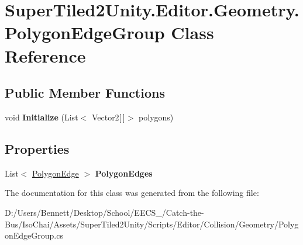 \hypertarget{class_super_tiled2_unity_1_1_editor_1_1_geometry_1_1_polygon_edge_group}{}\section{Super\+Tiled2\+Unity.\+Editor.\+Geometry.\+Polygon\+Edge\+Group Class Reference}
\label{class_super_tiled2_unity_1_1_editor_1_1_geometry_1_1_polygon_edge_group}
\subsection*{Public Member Functions}
\begin{DoxyCompactItemize}
\item 
\mbox{\label{class_super_tiled2_unity_1_1_editor_1_1_geometry_1_1_polygon_edge_group_a5bb3ef55d94324236da230c709122c20}} 
void {\bfseries Initialize} (List$<$ Vector2\mbox{[}$\,$\mbox{]}$>$ polygons)
\end{DoxyCompactItemize}
\subsection*{Properties}
\begin{DoxyCompactItemize}
\item 
\mbox{\label{class_super_tiled2_unity_1_1_editor_1_1_geometry_1_1_polygon_edge_group_a0a6243ec62d3a03b588acb68de09cc55}} 
List$<$ \mbox{\hyperlink{class_super_tiled2_unity_1_1_editor_1_1_geometry_1_1_polygon_edge}{Polygon\+Edge}} $>$ {\bfseries Polygon\+Edges}
\end{DoxyCompactItemize}


The documentation for this class was generated from the following file\+:\begin{DoxyCompactItemize}
\item 
D\+:/\+Users/\+Bennett/\+Desktop/\+School/\+E\+E\+C\+S\+\_/\+Catch-\/the-\/\+Bus/\+Iso\+Chai/\+Assets/\+Super\+Tiled2\+Unity/\+Scripts/\+Editor/\+Collision/\+Geometry/Polygon\+Edge\+Group.\+cs\end{DoxyCompactItemize}
